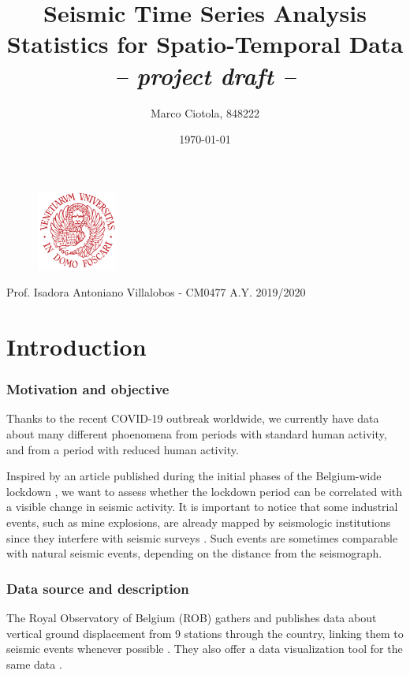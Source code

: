 \documentclass[12pt]{article}
\title{Seismic Time Series Analysis\\Statistics for Spatio-Temporal Data\\\textit{-- project draft --}}
\author{Marco Ciotola, 848222}
\date{\today}
\begin{document}
\maketitle
\begin{figure}[t!]
	\begin{center}
		\includegraphics[width=100px]{ca_foscari_logo.png}
	\end{center}
\end{figure}
\vfill Prof. Isadora Antoniano Villalobos - CM0477
\hfill A.Y. 2019/2020
\newpage
\tableofcontents \clearpage
{}



\section{Introduction}

\subsubsection{Motivation and objective}
Thanks to the recent COVID-19 outbreak worldwide, we currently have data about many different phoenomena from periods with standard human activity, and from a period with reduced human activity.

Inspired by an article published during the initial phases of the Belgium-wide lockdown \cite{NatureCoronavirusSeismic}, we want to assess whether the lockdown period can be correlated with a visible change in seismic activity.
It is important to notice that some industrial events, such as mine explosions, are already mapped by seismologic institutions since they interfere with seismic surveys \cite{OtherSeismicEvents}. Such events are sometimes comparable with natural seismic events, depending on the distance from the seismograph.

\subsubsection{Data source and description}
The Royal Observatory of Belgium (ROB) gathers and publishes \cite{RoyalDataPolicy,Data20200402} data about vertical ground displacement from 9 stations through the country, linking them to seismic events whenever possible \cite{DataEvents20200402}. They also offer a data visualization tool for the same data \cite{DataVisualization20200402}.
\end{document}
